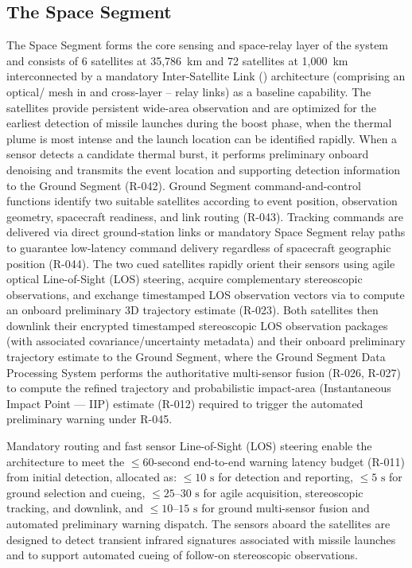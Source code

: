 \subsection{The Space Segment}
The Space Segment forms the core sensing and space-relay layer of the system and consists of 6  satellites at 35,786~km and 72  satellites at 1,000~km interconnected by a mandatory Inter-Satellite Link () architecture (comprising an optical/  mesh in  and cross-layer -- relay links) as a baseline capability. The  satellites provide persistent wide-area observation and are optimized for the earliest detection of missile launches during the boost phase, when the thermal plume is most intense and the launch location can be identified rapidly. When a  sensor detects a candidate thermal burst, it performs preliminary onboard denoising and transmits the event location and supporting detection information to the Ground Segment (R-042). Ground Segment command-and-control functions identify two suitable  satellites according to event position, observation geometry, spacecraft readiness, and link routing (R-043). Tracking commands are delivered via direct ground-station links or mandatory Space Segment  relay paths to guarantee low-latency command delivery regardless of spacecraft geographic position (R-044). The two cued  satellites rapidly orient their sensors using agile optical Line-of-Sight (LOS) steering, acquire complementary stereoscopic observations, and exchange timestamped LOS observation vectors via  to compute an onboard preliminary 3D trajectory estimate (R-023). Both satellites then downlink their encrypted timestamped stereoscopic LOS observation packages (with associated covariance/uncertainty metadata) and their onboard preliminary trajectory estimate to the Ground Segment, where the Ground Segment Data Processing System performs the authoritative multi-sensor fusion (R-026, R-027) to compute the refined trajectory and probabilistic impact-area (Instantaneous Impact Point --- IIP) estimate (R-012) required to trigger the automated preliminary warning under R-045.

Mandatory  routing and fast sensor Line-of-Sight (LOS) steering enable the architecture to meet the $\le 60\text{-second}$ end-to-end warning latency budget (R-011) from initial  detection, allocated as: $\le 10\text{ s}$ for  detection and reporting, $\le 5\text{ s}$ for ground selection and  cueing, $\le 25\text{--}30\text{ s}$ for  agile acquisition, stereoscopic tracking, and downlink, and $\le 10\text{--}15\text{ s}$ for ground multi-sensor fusion and automated preliminary warning dispatch. The sensors aboard the satellites are designed to detect transient infrared signatures associated with missile launches and to support automated cueing of follow-on stereoscopic observations. 


